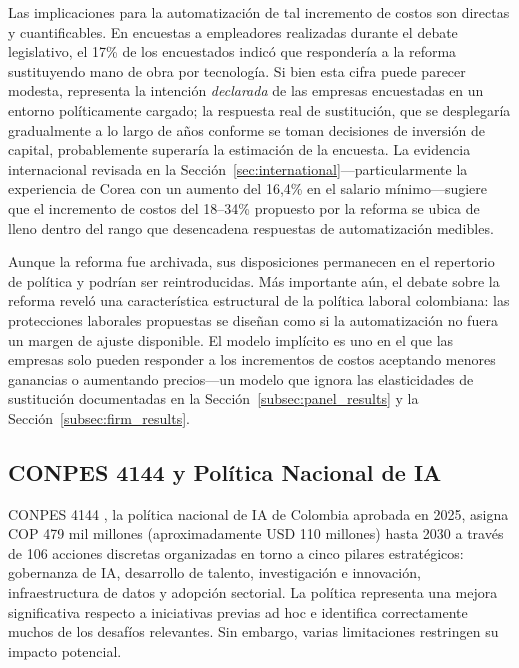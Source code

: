 \documentclass{article}
\begin{document}
Las implicaciones para la automatizaci\'on de tal incremento de costos son directas y cuantificables. En encuestas a empleadores realizadas durante el debate legislativo, el 17\% de los encuestados indic\'o que responder\'ia a la reforma sustituyendo mano de obra por tecnolog\'ia. Si bien esta cifra puede parecer modesta, representa la intenci\'on \textit{declarada} de las empresas encuestadas en un entorno pol\'iticamente cargado; la respuesta real de sustituci\'on, que se desplegar\'ia gradualmente a lo largo de a\~nos conforme se toman decisiones de inversi\'on de capital, probablemente superar\'ia la estimaci\'on de la encuesta. La evidencia internacional revisada en la Secci\'on~\ref{sec:international}---particularmente la experiencia de Corea con un aumento del 16,4\% en el salario m\'inimo---sugiere que el incremento de costos del 18--34\% propuesto por la reforma se ubica de lleno dentro del rango que desencadena respuestas de automatizaci\'on medibles.

Aunque la reforma fue archivada, sus disposiciones permanecen en el repertorio de pol\'itica y podr\'ian ser reintroducidas. M\'as importante a\'un, el debate sobre la reforma revel\'o una caracter\'istica estructural de la pol\'itica laboral colombiana: las protecciones laborales propuestas se dise\~nan como si la automatizaci\'on no fuera un margen de ajuste disponible. El modelo impl\'icito es uno en el que las empresas solo pueden responder a los incrementos de costos aceptando menores ganancias o aumentando precios---un modelo que ignora las elasticidades de sustituci\'on documentadas en la Secci\'on~\ref{subsec:panel_results} y la Secci\'on~\ref{subsec:firm_results}.

\subsection{CONPES 4144 y Pol\'itica Nacional de IA}
\label{subsec:conpes}

CONPES 4144 \cite{conpes4144}, la pol\'itica nacional de IA de Colombia aprobada en 2025, asigna COP 479 mil millones (aproximadamente USD 110 millones) hasta 2030 a trav\'es de 106 acciones discretas organizadas en torno a cinco pilares estrat\'egicos: gobernanza de IA, desarrollo de talento, investigaci\'on e innovaci\'on, infraestructura de datos y adopci\'on sectorial. La pol\'itica representa una mejora significativa respecto a iniciativas previas ad hoc e identifica correctamente muchos de los desaf\'ios relevantes. Sin embargo, varias limitaciones restringen su impacto potencial.
\end{document}

